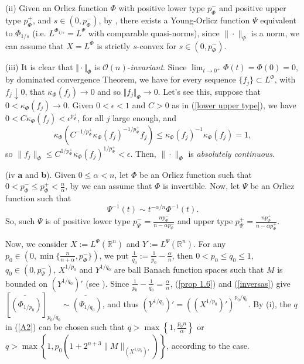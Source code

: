 \documentclass[oneside,10pt]{article}
\begin{document}
(ii) Given an Orlicz function $\Phi$ with positive lower type $p_{\Phi}^{-}$ and positive upper type 
$p_{\Phi}^{+}$, and $s \in (0, p_{\Phi}^{-})$, by \cite[Lemma 2.16]{Zhang2019}, there exists 
a Young-Orlicz function $\Psi$ equivalent to $\Phi_{1/s}$ (i.e. $L^{\Phi_{1/s}} = L^{\Psi}$ with comparable quasi-norms), since 
$\| \cdot \|_{\Psi}$ is a norm, we can assume that $X = L^{\Phi}$ is strictly $s$-convex for $s \in (0, p_{\Phi}^{-})$.

(iii) It is clear that $\Vert \cdot \Vert_{\Phi}$ is $\mathcal{O}(n)$-\textit{invariant}. Since $\lim_{t \to 0^{+}} \Phi(t) = \Phi(0) = 0$, 
by dominated convergence Theorem, we have for every sequence $\{ f_j \} \subset L^{\Phi}$, with $f_j \downarrow 0$, that 
$\kappa_{\Phi}(f_j) \to 0$ and so $\Vert f_j \Vert_{\Phi} \to 0$. Let's see this, suppose that $0< \kappa_{\Phi}(f_j) \to 0$. Given $
0 < \epsilon < 1$ and $C > 0$ as in (\ref{lower upper type}), we have $0 < C \kappa_{\Phi}(f_j) < \epsilon^{p_{\Phi}^{+}}$, for all $j$ large enough, and
\[
\kappa_{\Phi} \left( C^{-1/p_{\Phi}^{+}} \kappa_{\Phi}(f_j)^{-1/p_{\Phi}^{+}} f_j \right)  \leq \kappa_{\Phi}(f_j)^{-1} \kappa_{\Phi}(f_j) = 1, 
\]
so $\| f_j \|_{\Phi} \leq C^{1/p_{\Phi}^{+}} \kappa_{\Phi}(f_j)^{1/p_{\Phi}^{+}} < \epsilon$. Then, $\| \cdot \|_{\Phi}$ is \textit{absolutely continuous}.

(iv \textbf{a} and \textbf{b}).  Given $0 \leq \alpha < n$, let $\Phi$ be an Orlicz function such that 
$0 < p_{\Phi}^{-} \leq p_{\Phi}^{+} < \frac{n}{\alpha}$, by \cite[Lemma 2.5]{Zhang2019} we can assume that $\Phi$ is invertible. Now, let 
$\Psi$ be an Orlicz function such that
\begin{equation} \label{inversas}
\Psi^{-1}(t) \sim t^{-\alpha/n} \Phi^{-1}(t).
\end{equation}
So, such $\Psi$ is of positive lower type $p_{\Psi}^{-} = \frac{n p_{\Phi}^{-}}{n - \alpha p_{\Phi}^{-}}$ and upper type 
$p_{\Psi}^{+} =  \frac{n p_{\Phi}^{+}}{n - \alpha p_{\Phi}^{+}}$.


Now, we consider $X:= L^{\Phi}(\mathbb{R}^n)$ and $Y:= L^{\Psi}(\mathbb{R}^n)$. For any $p_0 \in (0, \min\{ \frac{n}{n+\alpha}, p_{\Phi}^{-} \})$, we put $\frac{1}{q_0}:= \frac{1}{p_0} - \frac{\alpha}{n}$, then $0 < p_0 \leq q_0 \leq 1$, $q_0 \in (0, p_{\Psi}^{-})$, $X^{1/p_0}$ 
and $Y^{1/q_0}$ are ball Banach function spaces such that $M$ is bounded on $(Y^{1/q_0})'$ (see \cite[Theorem 7.12]{sawa}). Since  
$\frac{1}{p_0} - \frac{1}{q_0}= \frac{\alpha}{n}$, (\ref{prop 1.6}) and (\ref{inversas}) give 
$[\widetilde{(\Phi_{1/p_0})}]_{p_0/q_0} \sim \widetilde{(\Psi_{1/q_0})}$, and thus $(Y^{1/q_0})' = ((X^{1/p_0})')^{p_0/q_0}$.
By (i), the $q$ in (\ref{A2}) can be chosen such that $q > \max \left\{1, \frac{p_0 n}{\alpha} \right\}$ or
$q > \max \left\{1, p_0 \left(1+2^{n+3} \| M \|_{(X^{1/p_0})'} \right) \right\}$, according to the case. 
\end{document}
